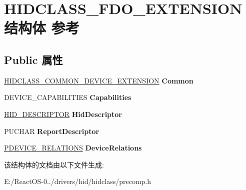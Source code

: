 \hypertarget{struct_h_i_d_c_l_a_s_s___f_d_o___e_x_t_e_n_s_i_o_n}{}\section{H\+I\+D\+C\+L\+A\+S\+S\+\_\+\+F\+D\+O\+\_\+\+E\+X\+T\+E\+N\+S\+I\+O\+N结构体 参考}
\label{struct_h_i_d_c_l_a_s_s___f_d_o___e_x_t_e_n_s_i_o_n}
\subsection*{Public 属性}
\begin{DoxyCompactItemize}
\item 
\mbox{\label{struct_h_i_d_c_l_a_s_s___f_d_o___e_x_t_e_n_s_i_o_n_a7f6de42bd37aa5522c1bfff2c347c7c8}} 
\hyperlink{struct_h_i_d_c_l_a_s_s___c_o_m_m_o_n___d_e_v_i_c_e___e_x_t_e_n_s_i_o_n}{H\+I\+D\+C\+L\+A\+S\+S\+\_\+\+C\+O\+M\+M\+O\+N\+\_\+\+D\+E\+V\+I\+C\+E\+\_\+\+E\+X\+T\+E\+N\+S\+I\+ON} {\bfseries Common}
\item 
\mbox{\label{struct_h_i_d_c_l_a_s_s___f_d_o___e_x_t_e_n_s_i_o_n_ab62740d673041b93045cd16ec4c4823d}} 
D\+E\+V\+I\+C\+E\+\_\+\+C\+A\+P\+A\+B\+I\+L\+I\+T\+I\+ES {\bfseries Capabilities}
\item 
\mbox{\label{struct_h_i_d_c_l_a_s_s___f_d_o___e_x_t_e_n_s_i_o_n_adc5a298579de304b4983169da476a978}} 
\hyperlink{struct___h_i_d___d_e_s_c_r_i_p_t_o_r}{H\+I\+D\+\_\+\+D\+E\+S\+C\+R\+I\+P\+T\+OR} {\bfseries Hid\+Descriptor}
\item 
\mbox{\label{struct_h_i_d_c_l_a_s_s___f_d_o___e_x_t_e_n_s_i_o_n_ae4530bbe725b2689cf57cc1135a4716a}} 
P\+U\+C\+H\+AR {\bfseries Report\+Descriptor}
\item 
\mbox{\label{struct_h_i_d_c_l_a_s_s___f_d_o___e_x_t_e_n_s_i_o_n_a374675fc0801e5b6ef094b31c00fbde6}} 
\hyperlink{struct___d_e_v_i_c_e___r_e_l_a_t_i_o_n_s}{P\+D\+E\+V\+I\+C\+E\+\_\+\+R\+E\+L\+A\+T\+I\+O\+NS} {\bfseries Device\+Relations}
\end{DoxyCompactItemize}


该结构体的文档由以下文件生成\+:\begin{DoxyCompactItemize}
\item 
E\+:/\+React\+O\+S-\/0../drivers/hid/hidclass/precomp.\+h\end{DoxyCompactItemize}
